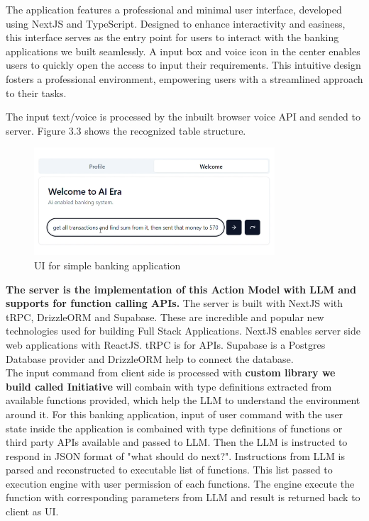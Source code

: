 \noindent
The application features a professional and minimal user interface, developed using NextJS and TypeScript. Designed to enhance interactivity and easiness, this interface serves as the entry point for users to interact with the banking applications we built seamlessly. A input box and voice icon in the center enables users to quickly open the access to input their requirements. This intuitive design fosters a professional environment, empowering users with a streamlined approach to their tasks.

\noindent The input text/voice is processed by the inbuilt browser voice API and sended to server. Figure 3.3 shows the recognized table structure.

\begin{figure}[h!]
    \centering
    \includegraphics[width=0.8\textwidth]{Images/prop_sys/ui_for_bank_app.png}
    \caption{UI for simple banking application}
\end{figure}

\noindent \textbf{The server is the implementation of this Action Model with LLM and supports for function calling APIs.} The server is built with NextJS with tRPC, DrizzleORM and Supabase. These are incredible and popular new technologies used for building Full Stack Applications. NextJS enables server side web applications with ReactJS. tRPC is for APIs. Supabase is a Postgres Database provider and DrizzleORM help to connect the database.\\ 

\noindent The input command from client side is processed with \textbf{custom library we build called Initiative} will combain with type definitions extracted from available functions provided, which help the LLM to understand the environment around it. For this banking application, input of user command with the user state inside the application is combained with type definitions of functions or third party APIs available and passed to LLM. Then the LLM is instructed to respond in JSON format of "what should do next?". Instructions from LLM is parsed and reconstructed to executable list of functions. This list passed to execution engine with user permission of each functions. The engine execute the function with corresponding parameters from LLM and result is returned back to client as UI.

